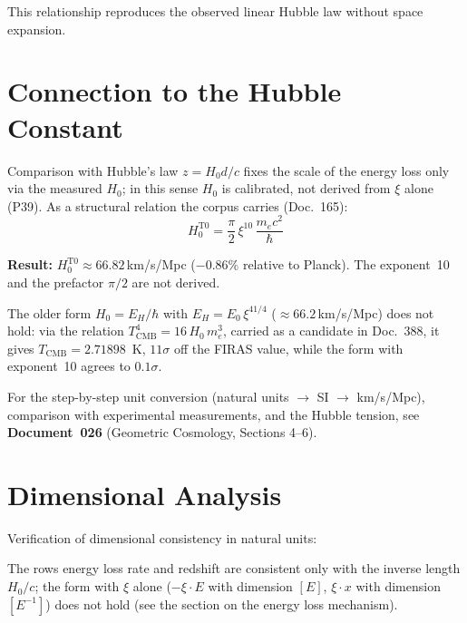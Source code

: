 	This relationship reproduces the observed linear Hubble law without space expansion.

\section{Connection to the Hubble Constant}

	Comparison with Hubble's law $z = H_0 d/c$ fixes the scale of the energy loss only via the measured $H_0$; in this sense $H_0$ is calibrated, not derived from $\xi$ alone (P39). As a structural relation the corpus carries (Doc.~165):
	\begin{equation}
		\boxed{H_0^{\text{T0}} = \frac{\pi}{2}\,\xi^{10}\,\frac{m_e c^2}{\hbar}}
	\end{equation}

	\textbf{Result:} $H_0^{\text{T0}} \approx 66.82\,$km/s/Mpc ($-0.86\%$ relative to Planck). The exponent~10 and the prefactor $\pi/2$ are not derived.

	The older form $H_0 = E_H/\hbar$ with $E_H = E_0\,\xi^{41/4}$ ($\approx 66.2\,$km/s/Mpc) does not hold: via the relation $T_{\mathrm{CMB}}^4 = 16\,H_0\,m_e^3$, carried as a candidate in Doc.~388, it gives $T_{\mathrm{CMB}} = 2.71898$~K, $11\sigma$ off the FIRAS value, while the form with exponent~10 agrees to $0.1\sigma$.

	For the step-by-step unit conversion (natural units $\rightarrow$ SI $\rightarrow$ km/s/Mpc), comparison with experimental measurements, and the Hubble tension, see \textbf{Document~026} (Geometric Cosmology, Sections 4--6).

\section{Dimensional Analysis}

	Verification of dimensional consistency in natural units:

	\begin{center}
	\end{center}
	The rows energy loss rate and redshift are consistent only with the inverse length $H_0/c$; the form with $\xi$ alone ($-\xi \cdot E$ with dimension $[E]$, $\xi \cdot x$ with dimension $[E^{-1}]$) does not hold (see the section on the energy loss mechanism).

